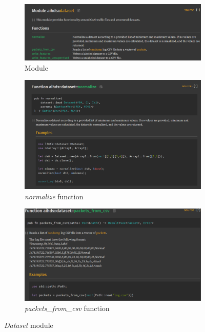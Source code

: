 \begin{figure}
    \centering
    \begin{subfigure}[b]{\linewidth}
        \includegraphics[width = \linewidth]{img/parts/docs/dataset/dataset.png}
        \caption{Module}
        \label{subfig:doc_dataset}
    \end{subfigure}
    \begin{subfigure}[b]{\linewidth}
        \includegraphics[width = \linewidth]{img/parts/docs/dataset/dataset_normalize.png}
        \caption{\emph{normalize} function}
        \label{subfig:doc_dataset_normalize}
    \end{subfigure}
    \begin{subfigure}[b]{\linewidth}
        \includegraphics[width = \linewidth]{img/parts/docs/dataset/dataset_packetsfromcsv.png}
        \caption{\emph{packets\_from\_csv} function}
        \label{subfig:doc_dataset_packetsfromcsv}
    \end{subfigure}
    \caption{\emph{Dataset} module}
    \label{fig:doc_dataset}
\end{figure}
